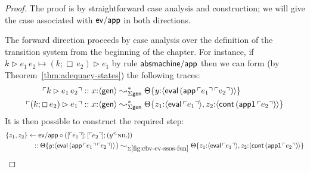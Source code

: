 \begin{proof} The proof is by straightforward case analysis and
  construction; we will give the case associated with ${\sf ev/app}$
  in both directions.

  The forward direction proceeds by case analysis over the definition
  of the transition system from the beginning of the chapter.  For
  instance, if $k \rhd e_1\,e_2 \mapsto (k; \Box\,e_2) \rhd e_1$ by
  rule ${\sf absmachine/app}$ then we can form (by
  Theorem~\ref{thm:adequacy-states}) the following traces:
  \begin{align*}
  {\ulcorner{k \rhd e_1\,e_2}\urcorner} 
  & :: x{:}\langle {\sf gen} \rangle \leadsto^*_{\Sigma\sf gen}
       {\Theta}\{{y{:}\langle {{\sf eval}\,({\sf app}\,{\ulcorner{e_1}\urcorner}\,{\ulcorner{e_2}\urcorner})} \rangle}\}
\\
  {\ulcorner{(k; \Box\,e_2) \rhd e_1}\urcorner} 
  & :: x{:}\langle {\sf gen} \rangle \leadsto^*_{\Sigma\sf gen}
       {\Theta}\{{{z_1{:}\langle {{\sf eval}\,{\ulcorner{e_1}\urcorner}} \rangle},{z_2{:}\langle {{\sf cont}\,({\sf app1}\,{\ulcorner{e_2}\urcorner})} \rangle}}\}
  \end{align*}
  It is then possible to construct the required step:
  \begin{align*} 
  &\{{z_1, z_2}\} \leftarrow {\sf ev/app} \circ {([{{\ulcorner{e_1}\urcorner}}]; {[{{\ulcorner{e_2}\urcorner}}]; {({y}{^{<}}{\textsc{nil}})}})}
  \\
  &\qquad\qquad :: {\Theta}\{{y{:}\langle {{\sf eval}\,({\sf app}\,{\ulcorner{e_1}\urcorner}\,{\ulcorner{e_2}\urcorner})} \rangle}\}
     \leadsto_{\Sigma\ref{fig:cbv-ev-ssos-fun}}
     {\Theta}\{{{z_1{:}\langle {{\sf eval}\,{\ulcorner{e_1}\urcorner}} \rangle},{z_2{:}\langle {{\sf cont}\,({\sf app1}\,{\ulcorner{e_2}\urcorner})} \rangle}}\}
  \end{align*}


\end{proof}
